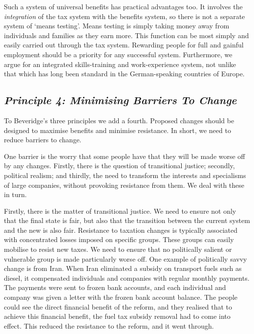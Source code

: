\documentclass[]{tufte-handout}
\begin{document}
Such a system of universal benefits has practical advantages too. It
involves the \emph{integration} of the tax system with the benefits
system, so there is not a separate system of `means testing'. Means
testing is simply taking money away from individuals and families as
they earn more. This function can be most simply and easily carried out
through the tax system. Rewarding people for full and gainful employment
should be a priority for any successful system. Furthermore, we argue
for an integrated skills-training and work-experience system, not unlike
that which has long been standard in the German-speaking countries of
Europe.

\hypertarget{principle-4-minimising-barriers-to-change}{%
\subsection{\texorpdfstring{\emph{Principle 4: Minimising Barriers To
Change}}{Principle 4: Minimising Barriers To Change}}\label{principle-4-minimising-barriers-to-change}}

To Beveridge's three principles we add a fourth. Proposed changes should
be designed to maximise benefits and minimise resistance. In short, we
need to reduce barriers to change.

One barrier is the worry that some people have that they will be made
worse off by any changes. Firstly, there is the question of transitional
justice; secondly, political realism; and thirdly, the need to transform
the interests and specialisms of large companies, without provoking
resistance from them. We deal with these in turn.

Firstly, there is the matter of transitional justice. We need to ensure
not only that the final state is fair, but also that the transition
between the current system and the new is also fair. Resistance to
taxation changes is typically associated with concentrated losses
imposed on specific groups. These groups can easily mobilise to resist
new taxes. We need to ensure that no politically salient or vulnerable
group is made particularly worse off. One example of politically savvy
change is from Iran. When Iran eliminated a subsidy on transport fuels
such as diesel, it compensated individuals and companies with regular
monthly payments. The payments were sent to frozen bank accounts, and
each individual and company was given a letter with the frozen bank
account balance. The people could see the direct financial benefit of
the reform, and they realised that to achieve this financial benefit,
the fuel tax subsidy removal had to come into effect. This reduced the
resistance to the reform, and it went through.
\end{document}
